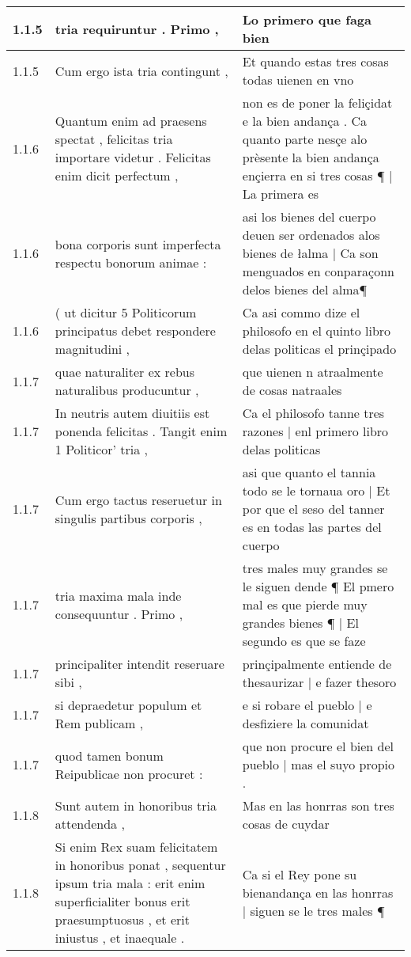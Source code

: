 \begin{tabular}{|p{1cm}|p{6.5cm}|p{6.5cm}|}
1.1.5 & tria requiruntur . Primo , & Lo primero que faga bien \\\hline
1.1.5 & Cum ergo ista tria contingunt , & Et quando estas tres cosas todas uienen en vno \\\hline
1.1.6 & Quantum enim ad praesens spectat , felicitas tria importare videtur . Felicitas enim dicit perfectum , & non es de poner la feliçidat e la bien andança . Ca quanto parte nesçe alo prèsente la bien andança ençierra en si tres cosas ¶ | La primera es \\\hline
1.1.6 & bona corporis sunt imperfecta respectu bonorum animae : & asi los bienes del cuerpo deuen ser ordenados alos bienes de łalma | Ca son menguados en conparaçonn delos bienes del alma¶ \\\hline
1.1.6 & ( ut dicitur 5 Politicorum principatus debet respondere magnitudini , & Ca asi commo dize el philosofo en el quinto libro delas politicas el prinçipado \\\hline
1.1.7 & quae naturaliter ex rebus naturalibus producuntur , & que uienen n atraalmente de cosas natraales \\\hline
1.1.7 & In neutris autem diuitiis est ponenda felicitas . Tangit enim 1 Politicor’ tria , & Ca el philosofo tanne tres razones | enl primero libro delas politicas \\\hline
1.1.7 & Cum ergo tactus reseruetur in singulis partibus corporis , & asi que quanto el tannia todo se le tornaua oro | Et por que el seso del tanner es en todas las partes del cuerpo \\\hline
1.1.7 & tria maxima mala inde consequuntur . Primo , & tres males muy grandes se le siguen dende ¶ El pmero mal es que pierde muy grandes bienes ¶ | El segundo es que se faze \\\hline
1.1.7 & principaliter intendit reseruare sibi , & prinçipalmente entiende de thesaurizar | e fazer thesoro \\\hline
1.1.7 & si depraedetur populum et Rem publicam , & e si robare el pueblo | e desfiziere la comunidat \\\hline
1.1.7 & quod tamen bonum Reipublicae non procuret : & que non procure el bien del pueblo | mas el suyo propio . \\\hline
1.1.8 & Sunt autem in honoribus tria attendenda , & Mas en las honrras son tres cosas de cuydar \\\hline
1.1.8 & Si enim Rex suam felicitatem in honoribus ponat , sequentur ipsum tria mala : erit enim superficialiter bonus erit praesumptuosus , et erit iniustus , et inaequale . & Ca si el Rey pone su bienandança en las honrras | siguen se le tres males ¶ \\\hline

\end{tabular}
